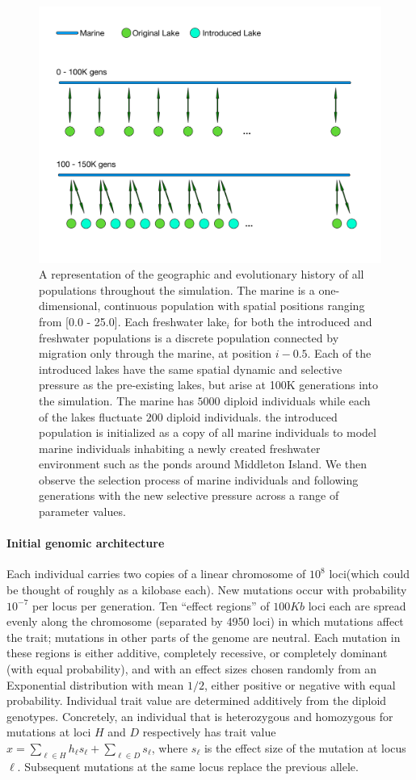 \documentclass{article}
\begin{document}
\begin{figure}
	\begin{center}
  		\includegraphics[width=0.6\linewidth]{GeographyFigure.pdf}
  		\caption{
			A representation of the geographic and evolutionary history of all populations throughout the simulation. 
		The marine is a one-dimensional, continuous population with spatial positions ranging from [0.0 - 25.0]. 
		Each freshwater lake$_{i}$ for both the introduced and freshwater populations
		is a discrete population connected by migration only through the marine, at position $i - 0.5$. 
		Each of the introduced lakes have the same spatial dynamic and selective pressure as the pre-existing lakes, but arise at 100K generations into the simulation.
		The marine has $5000$ diploid individuals while each of the lakes fluctuate  $200$ diploid individuals. 
		the introduced population is initialized as a copy of all marine individuals to model marine 
		individuals inhabiting a newly created freshwater environment such as the ponds around Middleton Island.
		We then observe the selection process of marine individuals and following generations 
		with the new selective pressure across a range of parameter values. 
			}
  		\label{fig:Geo}
	\end{center}
\end{figure}

\paragraph{Initial genomic architecture} Each individual carries two copies of a linear chromosome of $10^8$ loci(which could be thought of roughly as a kilobase each). 
New mutations occur with probability $10^{-7}$ per locus per generation. 
Ten ``effect regions'' of $100Kb$ loci each are spread evenly along the chromosome (separated by 4950 loci) in which mutations affect the trait; 
mutations in other parts of the genome are neutral. 
Each mutation in these regions is either additive, completely recessive, or completely dominant (with equal probability), 
and with an effect sizes chosen randomly from an Exponential distribution with mean $1/2$, either positive or negative with equal probability. 
Individual trait value are determined additively from the diploid genotypes. 
Concretely, an individual that is heterozygous and homozygous for mutations at loci $H$ and $D$ respectively has trait value 
$x = \sum_{\ell \in H} h_\ell s_\ell + \sum_{\ell \in D} s_\ell$, 
where $s_\ell$ is the effect size of the mutation at locus $\ell$. Subsequent mutations at the same locus replace the previous allele.
\end{document}
